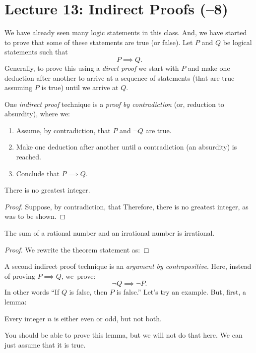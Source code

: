 \section*{Lecture 13: Indirect Proofs (--8)}

We have already seen many logic statements in this class.  And, we have started
to prove that some of these statements are true (or false).  Let $P$ and $Q$ be
logical statements such that
$$ P \implies Q.$$
Generally, to prove this using a \emph{direct proof} we start with $P$ and make
one deduction after another to arrive at a sequence of statements (that are true
assuming $P$ is true) until we arrive at $Q$.

One \emph{indirect proof} technique is a \emph{proof by contradiction}  (or,
reduction to absurdity), where
we:
\begin{enumerate}
    \item Assume, by contradiction, that $P$ and $\neg Q$ are true.
    \item Make one deduction after another until a contradiction (an absurdity) is reached.
    \item Conclude that $P \implies Q$.
\end{enumerate}

\begin{theorem}
    There is no greatest integer.
\end{theorem}
\begin{proof}
    Suppose, by contradiction, that
    \proofspace
    Therefore, there is no greatest integer, as was to be shown.
\end{proof}

\begin{theorem}
    The sum of a rational number and an irrational number is irrational.
\end{theorem}
\begin{proof}
    We rewrite the theorem statement as:

    \proofspace
\end{proof}

\pagebreak
A second indirect proof technique is an \emph{argument by contrapositive}.
Here, instead of proving $P \implies Q$, we~prove:
$$ \neg Q \implies \neg P. $$
In other words ``If $Q$ is false, then $P$ is false.''
Let's try an example.  But, first, a lemma:

\begin{lemma}
    Every integer $n$ is either even or odd, but not both.
\end{lemma}
You should be able to prove this lemma, but we will not do that here.  We can
just assume that it is true.

